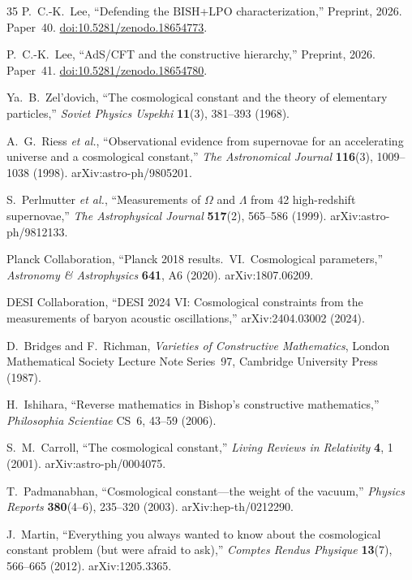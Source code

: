 \documentclass[11pt,a4paper]{article}
\theoremstyle{plain}
\theoremstyle{definition}
\newcommand{\LPO}{\ensuremath{\mathrm{LPO}}}
\newcommand{\BISH}{\ensuremath{\mathrm{BISH}}}
\begin{document}
\begin{thebibliography}{35}
P.~C.-K.~Lee,
``Defending the $\BISH$+$\LPO$ characterization,''
Preprint, 2026. Paper~40.
\href{https://doi.org/10.5281/zenodo.18654773}{doi:10.5281/zenodo.18654773}.

P.~C.-K.~Lee,
``AdS/CFT and the constructive hierarchy,''
Preprint, 2026. Paper~41.
\href{https://doi.org/10.5281/zenodo.18654780}{doi:10.5281/zenodo.18654780}.

Ya.~B.~Zel'dovich,
``The cosmological constant and the theory of elementary particles,''
\emph{Soviet Physics Uspekhi} \textbf{11}(3), 381--393 (1968).

A.~G.~Riess \emph{et al.},
``Observational evidence from supernovae for an accelerating universe
and a cosmological constant,''
\emph{The Astronomical Journal} \textbf{116}(3), 1009--1038 (1998).
arXiv:astro-ph/9805201.

S.~Perlmutter \emph{et al.},
``Measurements of $\Omega$ and $\Lambda$ from 42 high-redshift supernovae,''
\emph{The Astrophysical Journal} \textbf{517}(2), 565--586 (1999).
arXiv:astro-ph/9812133.

Planck Collaboration,
``Planck 2018 results.\ VI.\ Cosmological parameters,''
\emph{Astronomy \& Astrophysics} \textbf{641}, A6 (2020).
arXiv:1807.06209.

DESI Collaboration,
``DESI 2024 VI: Cosmological constraints from the measurements of
baryon acoustic oscillations,''
arXiv:2404.03002 (2024).

D.~Bridges and F.~Richman,
\emph{Varieties of Constructive Mathematics},
London Mathematical Society Lecture Note Series~97,
Cambridge University Press (1987).

H.~Ishihara,
``Reverse mathematics in Bishop's constructive mathematics,''
\emph{Philosophia Scientiae} CS~6, 43--59 (2006).

S.~M.~Carroll,
``The cosmological constant,''
\emph{Living Reviews in Relativity} \textbf{4}, 1 (2001).
arXiv:astro-ph/0004075.

T.~Padmanabhan,
``Cosmological constant---the weight of the vacuum,''
\emph{Physics Reports} \textbf{380}(4--6), 235--320 (2003).
arXiv:hep-th/0212290.

J.~Martin,
``Everything you always wanted to know about the cosmological constant
problem (but were afraid to ask),''
\emph{Comptes Rendus Physique} \textbf{13}(7), 566--665 (2012).
arXiv:1205.3365.


\end{thebibliography}
\end{document}
